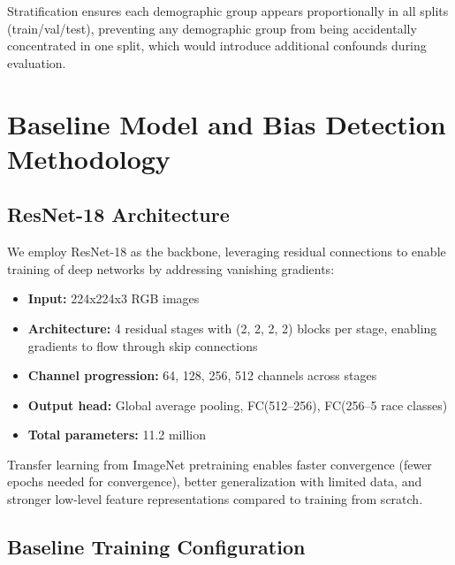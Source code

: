\documentclass[11pt,a4paper,oneside]{report}
\begin{document}
Stratification ensures each demographic group appears proportionally in all splits (train/val/test), preventing any demographic group from being accidentally concentrated in one split, which would introduce additional confounds during evaluation.


\chapter{Baseline Model and Bias Detection Methodology}

\section{ResNet-18 Architecture}

We employ ResNet-18 as the backbone, leveraging residual connections to enable training of deep networks by addressing vanishing gradients:

\begin{itemize}

\item \textbf{Input:} 224x224x3 RGB images

\item \textbf{Architecture:} 4 residual stages with (2, 2, 2, 2) blocks per stage, enabling gradients to flow through skip connections

\item \textbf{Channel progression:} 64, 128, 256, 512 channels across stages

\item \textbf{Output head:} Global average pooling, FC(512--256), FC(256--5 race classes)

\item \textbf{Total parameters:} 11.2 million

\end{itemize}

Transfer learning from ImageNet pretraining enables faster convergence (fewer epochs needed for convergence), better generalization with limited data, and stronger low-level feature representations compared to training from scratch.

\section{Baseline Training Configuration}
\end{document}
